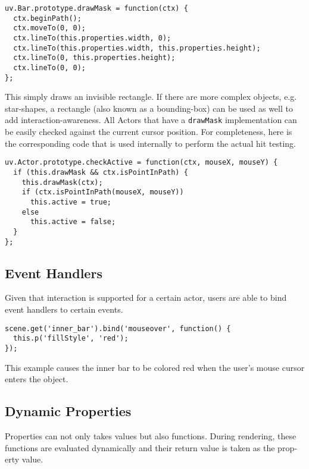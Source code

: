 \begin{english}
\begin{verbatim}
uv.Bar.prototype.drawMask = function(ctx) {
  ctx.beginPath();
  ctx.moveTo(0, 0);
  ctx.lineTo(this.properties.width, 0);
  ctx.lineTo(this.properties.width, this.properties.height);
  ctx.lineTo(0, this.properties.height);
  ctx.lineTo(0, 0);
};
\end{verbatim}

\SuperPar This simply draws an invisible rectangle. If there are more complex objects, e.g. star-shapes, a rectangle (also known as a bounding-box) can be used as well to add interaction-awareness. All Actors that have a \texttt{drawMask} implementation can be easily checked against the current cursor position. For completeness, here is the corresponding code that is used internally to perform the actual hit testing.

\begin{verbatim}
uv.Actor.prototype.checkActive = function(ctx, mouseX, mouseY) {
  if (this.drawMask && ctx.isPointInPath) {
    this.drawMask(ctx);
    if (ctx.isPointInPath(mouseX, mouseY))
      this.active = true;
    else
      this.active = false;
  }
};
\end{verbatim}


\subsection{Event Handlers}

Given that interaction is supported for a certain actor, users are able to bind event handlers to certain events.

\begin{verbatim}
scene.get('inner_bar').bind('mouseover', function() {
  this.p('fillStyle', 'red');
});
\end{verbatim}

\SuperPar This example causes the inner bar to be colored red when the user's mouse cursor enters the object.

\subsection{Dynamic Properties}

Properties can not only takes values but also functions. During rendering, these functions are evaluated dynamically and their return value is taken as the property value.


\end{english}
